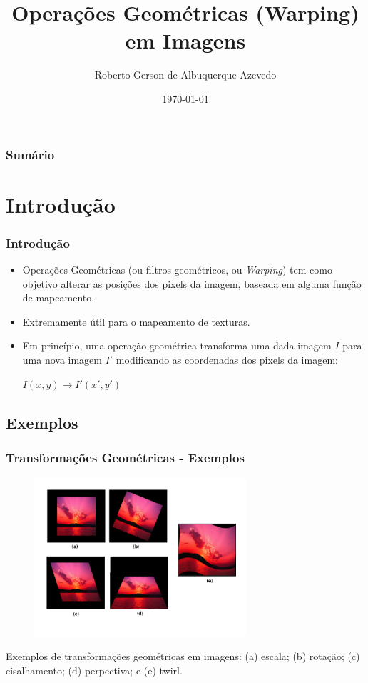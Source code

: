 \documentclass{beamer}
\title[Operações Geométricas (Warping) em Imagens]{Operações Geométricas
(Warping) em Imagens}
\author[Roberto Azevedo]{Roberto Gerson de Albuquerque Azevedo}
\institute{Foundations of Computer Graphics 2011.1 PUC-Rio}
\date{\today}
\begin{document}
\frame{\titlepage} %
\begin{frame}
 \frametitle{Sumário}
 \tableofcontents
\end{frame}
\section{Introdução}
\begin{frame}
\frametitle{Introdução}
\begin{itemize}
 \item Operações Geométricas (ou filtros geométricos, ou \textit{Warping}) tem
como objetivo alterar as posições dos pixels da imagem, baseada em alguma função
de mapeamento.
  \item Extremamente útil para o mapeamento de texturas.
  \item Em princípio, uma operação geométrica transforma uma dada imagem $I$
para uma nova imagem $I'$ modificando as coordenadas dos pixels da imagem:
\par
\begin{center}
 $I(x,y) \rightarrow I'(x', y')$
\end{center}

\end{itemize}
\end{frame}

\subsection{Exemplos}
\begin{frame}
 \frametitle{Transformações Geométricas - Exemplos}
\begin{figure}[ht!]
  \centering
  \includegraphics[width=0.70\textwidth]{img/typical-geometric-transform.png}
\end{figure}
Exemplos de transformações geométricas em imagens: (a) escala; (b) rotação; (c)
cisalhamento; (d) perpectiva; e (e) twirl.
\end{frame}
\end{document}
